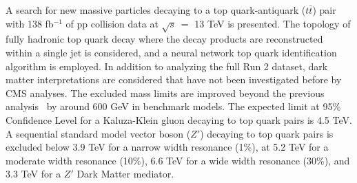 
A search for new massive particles decaying to a top quark-antiquark ($t\bar{t}$) pair with 138 fb$^{-1}$ of pp collision data at $\sqrt{s}\ =$ 13 TeV is presented. The topology of fully hadronic top quark decay where the decay products are reconstructed within a single jet is considered, and a neural network top quark identification algorithm is employed. In addition to analyzing the full Run 2 dataset, dark matter interpretations are considered that have not been investigated before by CMS analyses. The excluded mass limits are improved beyond the previous analysis~\cite{13tevZprime_CMScombo2015} by around 600 GeV in benchmark models. The expected limit at 95\% Confidence Level for a Kaluza-Klein gluon decaying to top quark pairs is 4.5 TeV. A sequential standard model vector boson ($Z'$) decaying to top quark pairs is excluded below 3.9 TeV for a narrow width resonance (1\%), at 5.2 TeV for a moderate width resonance (10\%), 6.6 TeV for a wide width resonance (30\%), and 3.3 TeV for a $Z'$ Dark Matter mediator. 

